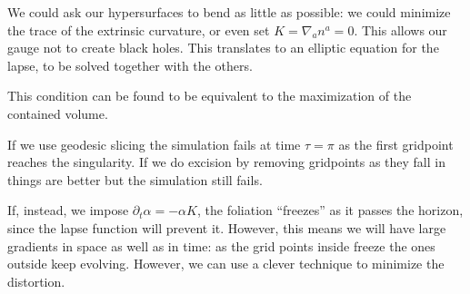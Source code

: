 \documentclass[main.tex]{subfiles}
\begin{document}
We could ask our hypersurfaces to bend as little as possible: we could minimize the trace of the extrinsic curvature, or even set \(K = \nabla_a n^a = 0\). This allows our gauge not to create black holes. 
This translates to an elliptic equation for the lapse, to be solved together with the others. 

This condition can be found to be equivalent to the maximization of the contained volume. 

If we use geodesic slicing the simulation fails at time \(\tau  = \pi \) as the first gridpoint reaches the singularity. 
If we do excision by removing gridpoints as they fall in things are better but the simulation still fails. 

If, instead, we impose \(\partial_t \alpha = - \alpha K\), the foliation ``freezes'' as it passes the horizon, since the lapse function will prevent it. 
However, this means we will have large gradients in space as well as in time: as the grid points inside freeze the ones outside keep evolving. 
However, we can use a clever technique to minimize the distortion. 
\end{document}
